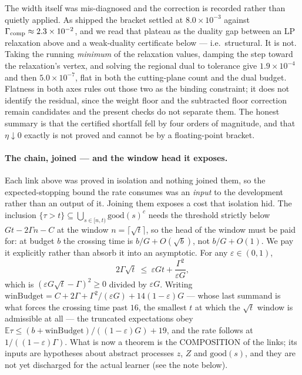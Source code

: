 The width itself was mis-diagnosed and the correction is recorded rather than quietly
applied. As shipped the bracket settled at $8.0\times10^{-3}$ against
$\Gamma_{\rm comp}\approx2.3\times10^{-2}$, and we read that plateau as the duality gap
between an LP relaxation above and a weak-duality certificate below --- i.e.\ structural.
It is not. Taking the running \emph{minimum} of the relaxation values, damping the step
toward the relaxation's vertex, and solving the regional dual to tolerance give
$1.9\times10^{-4}$ and then $5.0\times10^{-7}$, flat in both the cutting-plane count and
the dual budget. Flatness in both axes rules out those two as the binding constraint; it
does not identify the residual, since the weight floor and the subtracted floor correction
remain candidates and the present checks do not separate them. The honest summary is that
the certified shortfall fell by four orders of magnitude, and that $\eta\downarrow0$
exactly is not proved and cannot be by a floating-point bracket.


\paragraph{The chain, joined --- and the window head it exposes.}
Each link above was proved in isolation and nothing joined them, so the expected-stopping
bound the rate consumes was an \emph{input} to the development rather than an output of it.
Joining them exposes a cost that isolation hid. The inclusion
$\{\tau>t\}\subseteq\bigcup_{s\in[n,t)}\mathrm{good}(s)^{c}$ needs the threshold strictly
below $Gt-2\Gamma n-C$ at the window $n=\lceil\sqrt t\rceil$, so the head of the window must
be paid for: at budget $b$ the crossing time is $b/G+O(\sqrt b)$, not $b/G+O(1)$. We pay it
explicitly rather than absorb it into an asymptotic. For any $\varepsilon\in(0,1)$,
\[
2\Gamma\sqrt t\ \le\ \varepsilon G t+\frac{\Gamma^{2}}{\varepsilon G},
\]
which is $(\varepsilon G\sqrt t-\Gamma)^{2}\ge0$ divided by $\varepsilon G$. Writing
$\mathrm{winBudget}=C+2\Gamma+\Gamma^{2}/(\varepsilon G)+14(1-\varepsilon)G$ --- whose last
summand is what forces the crossing time past $16$, the smallest $t$ at which the $\sqrt t$
window is admissible at all --- the truncated expectations obey
$\mathbb{E}\tau\le(b+\mathrm{winBudget})/((1-\varepsilon)G)+19$, and the rate follows at
$1/((1-\varepsilon)\Gamma)$. What is now a theorem is the COMPOSITION of the links; its
inputs are hypotheses about abstract processes $z$, $Z$ and $\mathrm{good}(s)$, and they are
not yet discharged for the actual learner (see the note below).

